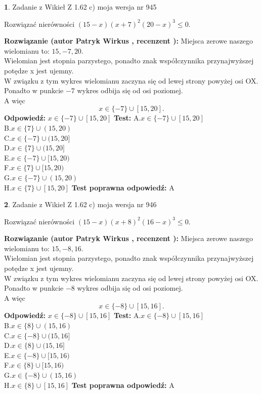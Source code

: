 \documentclass[12pt, a4paper]{article}
\theoremstyle{definition} %
\newtheorem{zad}{}
\newcommand{\zadStart}[1]{\begin{zad}#1\newline}
\newcommand{\zadStop}{\end{zad}}
\newcommand{\rozwStart}[2]{\noindent \textbf{Rozwiązanie (autor #1 , recenzent #2): }\newline}
\newcommand{\rozwStop}{\newline}
\newcommand{\odpStart}{\noindent \textbf{Odpowiedź:}\newline}
\newcommand{\odpStop}{\newline}
\newcommand{\testStart}{\noindent \textbf{Test:}\newline}
\newcommand{\testStop}{\newline}
\newcommand{\kluczStart}{\noindent \textbf{Test poprawna odpowiedź:}\newline}
\newcommand{\kluczStop}{\newline}
\begin{document}
\zadStart{Zadanie z Wikieł Z 1.62 c) moja wersja nr 945}

Rozwiązać nierówności $(15-x)(x+7)^{2}(20-x)^{3}\le0$.
\zadStop
\rozwStart{Patryk Wirkus}{}
Miejsca zerowe naszego wielomianu to: $15, -7, 20$.\\
Wielomian jest stopnia parzystego, ponadto znak współczynnika przy\linebreak najwyższej potędze x jest ujemny.\\ W związku z tym wykres wielomianu zaczyna się od lewej strony powyżej osi OX.\\
Ponadto w punkcie $-7$ wykres odbija się od osi poziomej.\\
A więc $$x \in \{-7\} \cup [15,20].$$
\rozwStop
\odpStart
$x \in \{-7\} \cup [15,20]$
\odpStop
\testStart
A.$x \in \{-7\} \cup [15,20]$\\
B.$x \in \{7\} \cup (15,20)$\\
C.$x \in \{-7\} \cup (15,20]$\\
D.$x \in \{7\} \cup (15,20]$\\
E.$x \in \{-7\} \cup [15,20)$\\
F.$x \in \{7\} \cup [15,20)$\\
G.$x \in \{-7\} \cup (15,20)$\\
H.$x \in \{7\} \cup [15,20]$
\testStop
\kluczStart
A
\kluczStop



\zadStart{Zadanie z Wikieł Z 1.62 c) moja wersja nr 946}

Rozwiązać nierówności $(15-x)(x+8)^{2}(16-x)^{3}\le0$.
\zadStop
\rozwStart{Patryk Wirkus}{}
Miejsca zerowe naszego wielomianu to: $15, -8, 16$.\\
Wielomian jest stopnia parzystego, ponadto znak współczynnika przy\linebreak najwyższej potędze x jest ujemny.\\ W związku z tym wykres wielomianu zaczyna się od lewej strony powyżej osi OX.\\
Ponadto w punkcie $-8$ wykres odbija się od osi poziomej.\\
A więc $$x \in \{-8\} \cup [15,16].$$
\rozwStop
\odpStart
$x \in \{-8\} \cup [15,16]$
\odpStop
\testStart
A.$x \in \{-8\} \cup [15,16]$\\
B.$x \in \{8\} \cup (15,16)$\\
C.$x \in \{-8\} \cup (15,16]$\\
D.$x \in \{8\} \cup (15,16]$\\
E.$x \in \{-8\} \cup [15,16)$\\
F.$x \in \{8\} \cup [15,16)$\\
G.$x \in \{-8\} \cup (15,16)$\\
H.$x \in \{8\} \cup [15,16]$
\testStop
\kluczStart
A
\kluczStop
\end{document}
